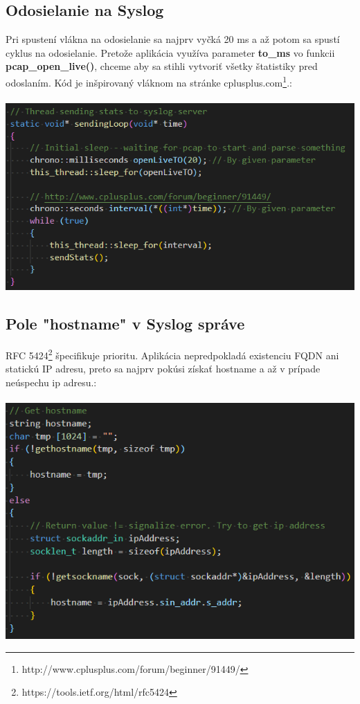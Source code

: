 \documentclass{article}
\begin{document}
        \subsection{Odosielanie na Syslog}
        Pri spustení vlákna na odosielanie sa najprv vyčká 20 ms a až potom sa spustí cyklus na odosielanie. Pretože aplikácia využíva parameter \textbf{to\_ms}
        vo funkcii \textbf{pcap\_open\_live()}, chceme aby sa stihli vytvoriť všetky štatistiky pred odoslaním. Kód je inšpirovaný vláknom na stránke
        cplusplus.com\footnote{http://www.cplusplus.com/forum/beginner/91449/}.:\\\\
        \includegraphics[scale=0.6]{loop.png}
        

        \subsection{Pole "hostname" v Syslog správe}
        RFC 5424\footnote{https://tools.ietf.org/html/rfc5424} špecifikuje prioritu. Aplikácia nepredpokladá existenciu FQDN ani statickú IP adresu, preto
        sa najprv pokúsi získať hostname a až v prípade neúspechu ip adresu.:\\\\
        \includegraphics[scale=0.6]{hostname.png}
\end{document}
